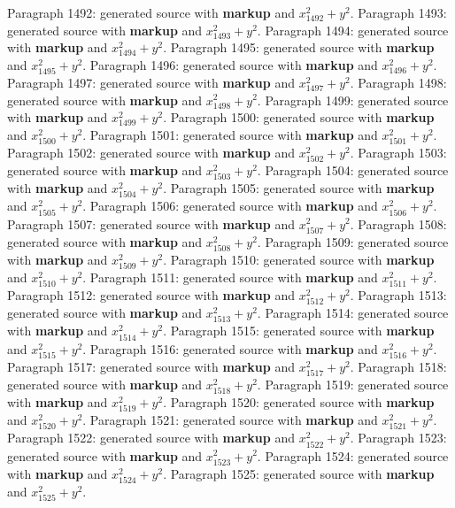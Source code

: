 \documentclass{article}
\begin{document}
Paragraph 1492: generated source with \textbf{markup} and $x_{1492}^2 + y^2$.
Paragraph 1493: generated source with \textbf{markup} and $x_{1493}^2 + y^2$.
Paragraph 1494: generated source with \textbf{markup} and $x_{1494}^2 + y^2$.
Paragraph 1495: generated source with \textbf{markup} and $x_{1495}^2 + y^2$.
Paragraph 1496: generated source with \textbf{markup} and $x_{1496}^2 + y^2$.
Paragraph 1497: generated source with \textbf{markup} and $x_{1497}^2 + y^2$.
Paragraph 1498: generated source with \textbf{markup} and $x_{1498}^2 + y^2$.
Paragraph 1499: generated source with \textbf{markup} and $x_{1499}^2 + y^2$.
Paragraph 1500: generated source with \textbf{markup} and $x_{1500}^2 + y^2$.
Paragraph 1501: generated source with \textbf{markup} and $x_{1501}^2 + y^2$.
Paragraph 1502: generated source with \textbf{markup} and $x_{1502}^2 + y^2$.
Paragraph 1503: generated source with \textbf{markup} and $x_{1503}^2 + y^2$.
Paragraph 1504: generated source with \textbf{markup} and $x_{1504}^2 + y^2$.
Paragraph 1505: generated source with \textbf{markup} and $x_{1505}^2 + y^2$.
Paragraph 1506: generated source with \textbf{markup} and $x_{1506}^2 + y^2$.
Paragraph 1507: generated source with \textbf{markup} and $x_{1507}^2 + y^2$.
Paragraph 1508: generated source with \textbf{markup} and $x_{1508}^2 + y^2$.
Paragraph 1509: generated source with \textbf{markup} and $x_{1509}^2 + y^2$.
Paragraph 1510: generated source with \textbf{markup} and $x_{1510}^2 + y^2$.
Paragraph 1511: generated source with \textbf{markup} and $x_{1511}^2 + y^2$.
Paragraph 1512: generated source with \textbf{markup} and $x_{1512}^2 + y^2$.
Paragraph 1513: generated source with \textbf{markup} and $x_{1513}^2 + y^2$.
Paragraph 1514: generated source with \textbf{markup} and $x_{1514}^2 + y^2$.
Paragraph 1515: generated source with \textbf{markup} and $x_{1515}^2 + y^2$.
Paragraph 1516: generated source with \textbf{markup} and $x_{1516}^2 + y^2$.
Paragraph 1517: generated source with \textbf{markup} and $x_{1517}^2 + y^2$.
Paragraph 1518: generated source with \textbf{markup} and $x_{1518}^2 + y^2$.
Paragraph 1519: generated source with \textbf{markup} and $x_{1519}^2 + y^2$.
Paragraph 1520: generated source with \textbf{markup} and $x_{1520}^2 + y^2$.
Paragraph 1521: generated source with \textbf{markup} and $x_{1521}^2 + y^2$.
Paragraph 1522: generated source with \textbf{markup} and $x_{1522}^2 + y^2$.
Paragraph 1523: generated source with \textbf{markup} and $x_{1523}^2 + y^2$.
Paragraph 1524: generated source with \textbf{markup} and $x_{1524}^2 + y^2$.
Paragraph 1525: generated source with \textbf{markup} and $x_{1525}^2 + y^2$.
\end{document}
